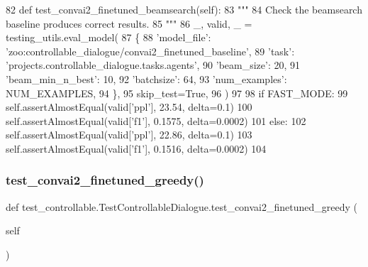 \begin{DoxyCode}
82     \textcolor{keyword}{def }test\_convai2\_finetuned\_beamsearch(self):
83         \textcolor{stringliteral}{"""}
84 \textcolor{stringliteral}{        Check the beamsearch baseline produces correct results.}
85 \textcolor{stringliteral}{        """}
86         \_, valid, \_ = testing\_utils.eval\_model(
87             \{
88                 \textcolor{stringliteral}{'model\_file'}: \textcolor{stringliteral}{'zoo:controllable\_dialogue/convai2\_finetuned\_baseline'},
89                 \textcolor{stringliteral}{'task'}: \textcolor{stringliteral}{'projects.controllable\_dialogue.tasks.agents'},
90                 \textcolor{stringliteral}{'beam\_size'}: 20,
91                 \textcolor{stringliteral}{'beam\_min\_n\_best'}: 10,
92                 \textcolor{stringliteral}{'batchsize'}: 64,
93                 \textcolor{stringliteral}{'num\_examples'}: NUM\_EXAMPLES,
94             \},
95             skip\_test=\textcolor{keyword}{True},
96         )
97 
98         \textcolor{keywordflow}{if} FAST\_MODE:
99             self.assertAlmostEqual(valid[\textcolor{stringliteral}{'ppl'}], 23.54, delta=0.1)
100             self.assertAlmostEqual(valid[\textcolor{stringliteral}{'f1'}], 0.1575, delta=0.0002)
101         \textcolor{keywordflow}{else}:
102             self.assertAlmostEqual(valid[\textcolor{stringliteral}{'ppl'}], 22.86, delta=0.1)
103             self.assertAlmostEqual(valid[\textcolor{stringliteral}{'f1'}], 0.1516, delta=0.0002)
104 
\end{DoxyCode}
\mbox{\label{classtest__controllable_1_1TestControllableDialogue_af293a117beb40fbfe28314beb4b88f35}} 
\subsubsection{\texorpdfstring{test\+\_\+convai2\+\_\+finetuned\+\_\+greedy()}{test\_convai2\_finetuned\_greedy()}}
{\footnotesize\ttfamily def test\+\_\+controllable.\+Test\+Controllable\+Dialogue.\+test\+\_\+convai2\+\_\+finetuned\+\_\+greedy (\begin{DoxyParamCaption}\item[{}]{self }\end{DoxyParamCaption})}

